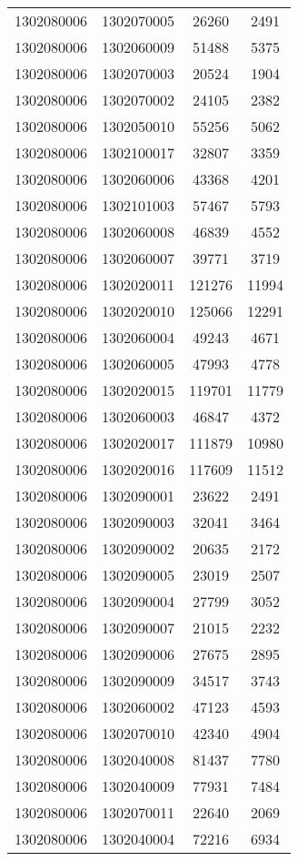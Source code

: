 \begin{longtable}[h]{llcc}
		1302080006 & 1302070005 & 26260 & 2491\\
		1302080006 & 1302060009 & 51488 & 5375\\
		1302080006 & 1302070003 & 20524 & 1904\\
		1302080006 & 1302070002 & 24105 & 2382\\
		1302080006 & 1302050010 & 55256 & 5062\\
		1302080006 & 1302100017 & 32807 & 3359\\
		1302080006 & 1302060006 & 43368 & 4201\\
		1302080006 & 1302101003 & 57467 & 5793\\
		1302080006 & 1302060008 & 46839 & 4552\\
		1302080006 & 1302060007 & 39771 & 3719\\
		1302080006 & 1302020011 & 121276 & 11994\\
		1302080006 & 1302020010 & 125066 & 12291\\
		1302080006 & 1302060004 & 49243 & 4671\\
		1302080006 & 1302060005 & 47993 & 4778\\
		1302080006 & 1302020015 & 119701 & 11779\\
		1302080006 & 1302060003 & 46847 & 4372\\
		1302080006 & 1302020017 & 111879 & 10980\\
		1302080006 & 1302020016 & 117609 & 11512\\
		1302080006 & 1302090001 & 23622 & 2491\\
		1302080006 & 1302090003 & 32041 & 3464\\
		1302080006 & 1302090002 & 20635 & 2172\\
		1302080006 & 1302090005 & 23019 & 2507\\
		1302080006 & 1302090004 & 27799 & 3052\\
		1302080006 & 1302090007 & 21015 & 2232\\
		1302080006 & 1302090006 & 27675 & 2895\\
		1302080006 & 1302090009 & 34517 & 3743\\
		1302080006 & 1302060002 & 47123 & 4593\\
		1302080006 & 1302070010 & 42340 & 4904\\
		1302080006 & 1302040008 & 81437 & 7780\\
		1302080006 & 1302040009 & 77931 & 7484\\
		1302080006 & 1302070011 & 22640 & 2069\\
		1302080006 & 1302040004 & 72216 & 6934\\

\end{longtable}
